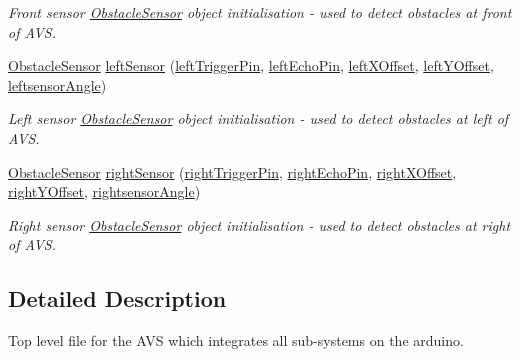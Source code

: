 \begin{DoxyCompactItemize}
\begin{DoxyCompactList}\small\item\em Front sensor \mbox{\hyperlink{class_obstacle_sensor}{Obstacle\+Sensor}} object initialisation -\/ used to detect obstacles at front of A\+VS. \end{DoxyCompactList}\item 
\mbox{\hyperlink{class_obstacle_sensor}{Obstacle\+Sensor}} \mbox{\hyperlink{bot_main_8ino_af137d1119f05ab98ae8e50559b9d6bfe}{left\+Sensor}} (\mbox{\hyperlink{bot_main_8ino_a297d5238270dc0d92e1a65b016a79f2e}{left\+Trigger\+Pin}}, \mbox{\hyperlink{bot_main_8ino_a203479aa2174a6eedd63da361e6e302c}{left\+Echo\+Pin}}, \mbox{\hyperlink{bot_main_8ino_a2d121af61e2977de12f5bfbbe8559dca}{left\+X\+Offset}}, \mbox{\hyperlink{bot_main_8ino_a7be9826e4f54e376321bcdea4177a8ed}{left\+Y\+Offset}}, \mbox{\hyperlink{bot_main_8ino_a8be5324bad65fa0bad41e0c70066a958}{leftsensor\+Angle}})
\begin{DoxyCompactList}\small\item\em Left sensor \mbox{\hyperlink{class_obstacle_sensor}{Obstacle\+Sensor}} object initialisation -\/ used to detect obstacles at left of A\+VS. \end{DoxyCompactList}\item 
\mbox{\hyperlink{class_obstacle_sensor}{Obstacle\+Sensor}} \mbox{\hyperlink{bot_main_8ino_a4b08258caa24173f4153413d596aea69}{right\+Sensor}} (\mbox{\hyperlink{bot_main_8ino_a906054d9d48970211789ac841d331898}{right\+Trigger\+Pin}}, \mbox{\hyperlink{bot_main_8ino_a513a215c9894c01e37f389b072c5cec4}{right\+Echo\+Pin}}, \mbox{\hyperlink{bot_main_8ino_ac932cddb5bc68094c96d0034c92faef9}{right\+X\+Offset}}, \mbox{\hyperlink{bot_main_8ino_a07903b96b48e8e456debd9cc43c7af05}{right\+Y\+Offset}}, \mbox{\hyperlink{bot_main_8ino_a83724535498f068d5b44150a2bc4fcf8}{rightsensor\+Angle}})
\begin{DoxyCompactList}\small\item\em Right sensor \mbox{\hyperlink{class_obstacle_sensor}{Obstacle\+Sensor}} object initialisation -\/ used to detect obstacles at right of A\+VS. \end{DoxyCompactList}\end{DoxyCompactItemize}


\subsection{Detailed Description}
Top level file for the A\+VS which integrates all sub-\/systems on the arduino. 

